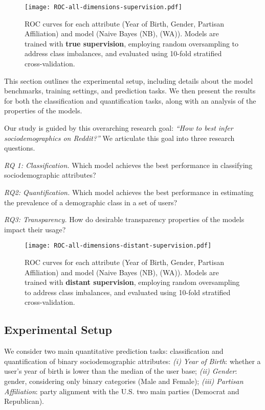 \begin{figure*}[ht!]
\texttt{[image: ROC-all-dimensions-supervision.pdf]}
\centering
\caption{ROC curves for each attribute (Year of Birth, Gender, Partisan Affiliation) and model (Naive Bayes (NB), \citeauthor{waller2021quantifying} (WA)). Models are trained with \textbf{true supervision}, employing random oversampling to address class imbalances, and evaluated using 10-fold stratified cross-validation.}
\label{fig:classif_true}
\end{figure*}


This section outlines the experimental setup, including details about the model benchmarks, training settings, and prediction tasks.
We then present the results for both the classification and quantification tasks, along with an analysis of the properties of the models.

Our study is guided by this overarching research goal: \emph{``How to best infer sociodemographics on Reddit?''}
We articulate this goal into three research questions.
\begin{squishlist}
\item \emph{RQ 1: Classification.}
Which model achieves the best performance in classifying sociodemographic attributes?
\item \emph{RQ2: Quantification.}
Which model achieves the best performance in estimating the prevalence of a demographic class in a set of users?
\item \emph{RQ3: Transparency.}
How do desirable transparency properties of the models impact their usage?
\end{squishlist}

\noindent


\begin{figure*}[h!]
\centering
\texttt{[image: ROC-all-dimensions-distant-supervision.pdf]}
\caption{ROC curves for each attribute (Year of Birth, Gender, Partisan Affiliation) and model (Naive Bayes (NB), \citeauthor{waller2021quantifying} (WA)). Models are trained with \textbf{distant supervision}, employing random oversampling to address class imbalances, and evaluated using 10-fold stratified cross-validation.}
\label{fig:classif_dist}
\end{figure*}


\subsection{Experimental Setup}
We consider two main quantitative prediction tasks: classification and quantification of binary sociodemographic attributes:
\emph{(i) Year of Birth}: whether a user's year of birth is lower than the median of the user base;
\emph{(ii) Gender}: gender, considering only binary categories (Male and Female);
\emph{(iii) Partisan Affiliation}: party alignment with the U.S. two main parties (Democrat and Republican).

